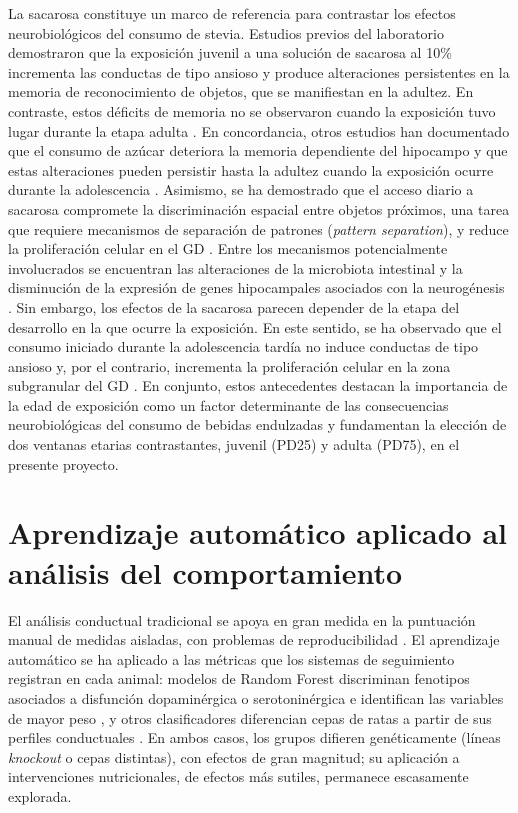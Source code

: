 La sacarosa constituye un marco de referencia para contrastar los efectos neurobiológicos del consumo de stevia. Estudios previos del laboratorio demostraron que la exposición juvenil a una solución de sacarosa al 10\% incrementa las conductas de tipo ansioso \cite{kruse2019sucrose} y produce alteraciones persistentes en la memoria de reconocimiento de objetos, que se manifiestan en la adultez. En contraste, estos déficits de memoria no se observaron cuando la exposición tuvo lugar durante la etapa adulta \cite{coirini2022sucrose}. En concordancia, otros estudios han documentado que el consumo de azúcar deteriora la memoria dependiente del hipocampo \cite{hsu2015sucrose,xu2018sucrose} y que estas alteraciones pueden persistir hasta la adultez cuando la exposición ocurre durante la adolescencia \cite{noble2019early,reichelt2015adolescent}. Asimismo, se ha demostrado que el acceso diario a sacarosa compromete la discriminación espacial entre objetos próximos, una tarea que requiere mecanismos de separación de patrones (\textit{pattern separation}), y reduce la proliferación celular en el GD \cite{reichelt2016sucrose}. Entre los mecanismos potencialmente involucrados se encuentran las alteraciones de la microbiota intestinal \cite{noble2021microbial} y la disminución de la expresión de genes hipocampales asociados con la neurogénesis \cite{maniam2016sugar}. Sin embargo, los efectos de la sacarosa parecen depender de la etapa del desarrollo en la que ocurre la exposición. En este sentido, se ha observado que el consumo iniciado durante la adolescencia tardía no induce conductas de tipo ansioso y, por el contrario, incrementa la proliferación celular en la zona subgranular del GD \cite{sanchezhuerta2022sucrose}. En conjunto, estos antecedentes destacan la importancia de la edad de exposición como un factor determinante de las consecuencias neurobiológicas del consumo de bebidas endulzadas y fundamentan la elección de dos ventanas etarias contrastantes, juvenil (PD25) y adulta (PD75), en el presente proyecto.

\section{Aprendizaje automático aplicado al análisis del comportamiento}\label{sec:ml-fenotipado}

El análisis conductual tradicional se apoya en gran medida en la puntuación manual de medidas aisladas, con problemas de reproducibilidad \cite{geros2020tracking}. El aprendizaje automático se ha aplicado a las métricas que los sistemas de seguimiento registran en cada animal: modelos de Random Forest discriminan fenotipos asociados a disfunción dopaminérgica o serotoninérgica e identifican las variables de mayor peso \cite{lukovikov2026cylinder}, y otros clasificadores diferencian cepas de ratas a partir de sus perfiles conductuales \cite{geros2020tracking}. En ambos casos, los grupos difieren genéticamente (líneas \textit{knockout} o cepas distintas), con efectos de gran magnitud; su aplicación a intervenciones nutricionales, de efectos más sutiles, permanece escasamente explorada.
